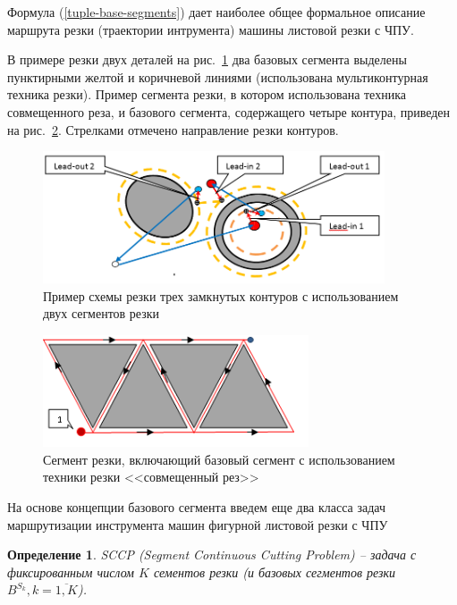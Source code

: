 \documentclass[11pt,twoside,openany]{report}
\newcounter{lem}
\newcounter{theo}
\newcounter{pred}
\newcounter{opred}
\newtheorem{opred}{Определение}[section]
\begin{document}
Формула (\ref{tuple-base-segments})
дает наиболее общее формальное описание маршрута резки (траектории интрумента)
машины листовой резки с ЧПУ.

В примере резки двух деталей
на рис.~\ref{cut2-1}
два базовых сегмента выделены пунктирными
желтой и коричневой линиями
(использована мультиконтурная техника резки).
Пример сегмента резки, в котором использована техника совмещенного реза,
и базового сегмента, содержащего четыре контура,
приведен на рис.~\ref{cut4-3}.
Стрелками отмечено направление резки контуров.

\begin{figure}[h]
  \begin{center}
  \includegraphics[width=0.9\textwidth]{cut2-1.png}
  \caption{Пример схемы резки трех замкнутых контуров с использованием двух сегментов резки}
  \label{cut2-1}
  \end{center}
\end{figure}

\begin{figure}[h]
  \begin{center}
  \includegraphics[width=0.7\textwidth]{cut4-3.png}
  \caption{Сегмент резки, включающий базовый сегмент с использованием техники резки <<совмещенный рез>>}
  \label{cut4-3}
  \end{center}
\end{figure}

На основе концепции базового сегмента введем еще
два класса задач маршрутизации инструмента машин
фигурной листовой резки с ЧПУ

\begin{opred}
  \label{def:SCCP}
  {\it SCCP (Segment Continuous Cutting Problem)}
  --
  задача с фиксированным числом $K$
  сементов резки
  (и базовых сегментов резки
  $B^{S_k}, k = \overline{1, K}$).
\end{opred}
\end{document}
